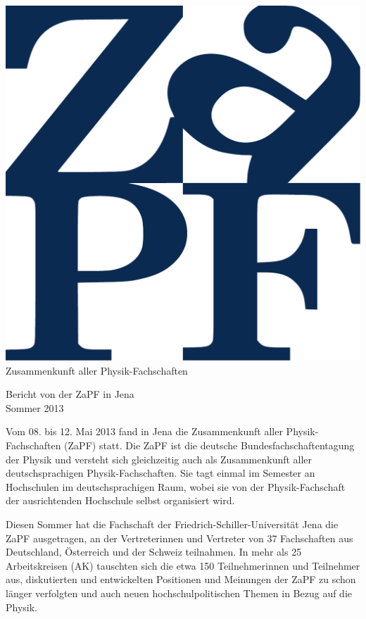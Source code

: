 \documentclass{scrartcl}
\begin{document}
\hspace{0.74\textwidth}
\begin{minipage}{0.25\textwidth}
\vspace{-1cm}
\centering
\includegraphics[width=.89\textwidth]{logo.pdf}
\small Zusammenkunft aller Physik-Fachschaften
\end{minipage}
 
\begin{center}
\vspace{1.5cm}
\huge{Bericht von der ZaPF in Jena \\ Sommer 2013} 
\vspace{1cm}
\end{center}
Vom 08. bis 12. Mai 2013 fand in Jena die Zusammenkunft aller Physik-Fachschaften (ZaPF) statt. Die ZaPF ist die deutsche Bundesfachschaftentagung der Physik und versteht sich gleichzeitig auch als Zusammenkunft aller deutschsprachigen Physik-Fachschaften. Sie tagt einmal im Semester an Hochschulen im deutschsprachigen Raum, wobei sie von der Physik-Fachschaft der ausrichtenden Hochschule selbst organisiert wird.

Diesen Sommer hat die Fachschaft der Friedrich-Schiller-Universit\"at Jena die ZaPF ausgetragen, an der Vertreterinnen und Vertreter von 37 Fachschaften aus  Deutschland, Österreich und der Schweiz teilnahmen. In mehr als 25 Arbeitskreisen (AK) tauschten sich die etwa 150 Teilnehmerinnen und Teilnehmer aus, diskutierten und entwickelten Positionen und Meinungen  der ZaPF zu schon länger verfolgten und auch neuen hochschulpolitischen Themen in Bezug auf die Physik.
\end{document}
